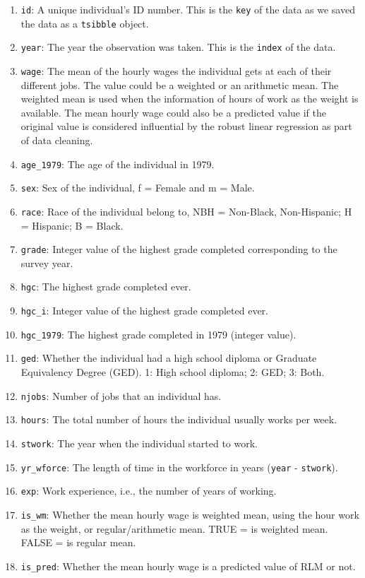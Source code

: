 \documentclass{article}
\begin{document}
\begin{enumerate}
\def\labelenumi{\arabic{enumi}.}
\item
  \texttt{id}: A unique individual's ID number. This is the \texttt{key} of the data as we saved the data as a \texttt{tsibble} object.
\item
  \texttt{year}: The year the observation was taken. This is the \texttt{index} of the data.
\item
  \texttt{wage}: The mean of the hourly wages the individual gets at each of their different jobs. The value could be a weighted or an arithmetic mean. The weighted mean is used when the information of hours of work as the weight is available. The mean hourly wage could also be a predicted value if the original value is considered influential by the robust linear regression as part of data cleaning.
\item
  \texttt{age\_1979}: The age of the individual in 1979.
\item
  \texttt{sex}: Sex of the individual, f = Female and m = Male.
\item
  \texttt{race}: Race of the individual belong to, NBH = Non-Black, Non-Hispanic; H = Hispanic; B = Black.
\item
  \texttt{grade}: Integer value of the highest grade completed corresponding to the survey year.
\item
  \texttt{hgc}: The highest grade completed ever.
\item
  \texttt{hgc\_i}: Integer value of the highest grade completed ever.
\item
  \texttt{hgc\_1979}: The highest grade completed in 1979 (integer value).
\item
  \texttt{ged}: Whether the individual had a high school diploma or Graduate Equivalency Degree (GED). 1: High school diploma; 2: GED; 3: Both.
\item
  \texttt{njobs}: Number of jobs that an individual has.
\item
  \texttt{hours}: The total number of hours the individual usually works per week.
\item
  \texttt{stwork}: The year when the individual started to work.
\item
  \texttt{yr\_wforce}: The length of time in the workforce in years (\texttt{year} - \texttt{stwork}).
\item
  \texttt{exp}: Work experience, i.e., the number of years of working.
\item
  \texttt{is\_wm}: Whether the mean hourly wage is weighted mean, using the hour work as the weight, or regular/arithmetic mean. TRUE = is weighted mean. FALSE = is regular mean.
\item
  \texttt{is\_pred}: Whether the mean hourly wage is a predicted value of RLM or not.
\end{enumerate}
\end{document}

